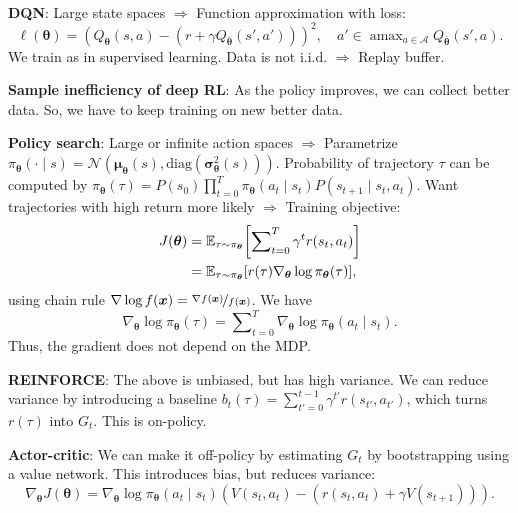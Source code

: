 \documentclass{article}
\DeclareMathOperator*{\argmax}{amax}
\newcommand{\lft}{\mathopen{}\mathclose\bgroup\left}
\newcommand{\rgt}{\aftergroup\egroup\right}
\newcommand{\E}{\mathbb{E}}
\renewcommand{\vec}[1]{\bm{#1}}
\newenvironment{topic}[1]
{\textbf{\sffamily \colorbox{black}{\rlap{\textbf{\textcolor{white}{#1}}}\hspace{\linewidth}\hspace{-2\fboxsep}}} \\ \vspace{0.2cm}}
{}
\begin{document}
\begin{multicols*}{2}
\begin{topic}{Reinforcement learning}
        \textbf{DQN}: Large state spaces $\Rightarrow$ Function approximation with loss: \[
            \ell(\vec{\theta}) = (Q_{\vec{\theta}}(s,a) - (r + \gamma Q_{\bar{\vec{\theta}}}(s', a')))^2, \quad a' \in \argmax\nolimits_{a \in \mathcal{A}} Q_{\bar{\vec{\theta}}}(s', a).
        \]
        We train as in supervised learning. Data is not i.i.d. $\Rightarrow$ Replay buffer.

        \textbf{Sample inefficiency of deep RL}: As the policy improves, we can collect better data.
        So, we have to keep training on new better data.

        \textbf{Policy search}: Large or infinite action spaces $\Rightarrow$ Parametrize $\pi_{\vec{\theta}}(\cdot \mid s) = \mathcal{N}(\vec{\mu}_{\vec{\theta}}(s), \mathrm{diag}(\vec{\sigma}_{\vec{\theta}}^2(s)))$.
        Probability of trajectory $\tau$ can be computed by $\pi_{\vec{\theta}}(\tau) = P(s_0) \prod\nolimits_{t=0}^T \pi_{\vec{\theta}}(a_t \mid s_t) P(s_{t+1} \mid s_t, a_t)$.
        Want trajectories with high return more likely $\Rightarrow$ Training objective:
        \begin{align*}
            J(\vec{\theta}) & = \E_{\tau \sim \pi_{\vec{\theta}}} \lft[ \sum\nolimits_{t=0}^{T} \gamma^t r(s_t, a_t) \rgt]         \\
                            & = \E_{\tau \sim \pi_{\vec{\theta}}} [ r(\tau) \nabla_{\vec{\theta}} \log \pi_{\vec{\theta}}(\tau) ],
        \end{align*}
        using chain rule $\nabla \log f(\vec{x}) = \nicefrac{\nabla f(\vec{x})}{f(\vec{x})}$. We have \[
            \nabla_{\vec{\theta}} \log \pi_{\vec{\theta}}(\tau) = \sum\nolimits_{t=0}^{T} \nabla_{\vec{\theta}} \log \pi_{\vec{\theta}}(a_t \mid s_t).
        \]
        Thus, the gradient does not depend on the MDP.

        \textbf{REINFORCE}: The above is unbiased, but has high variance. We can reduce variance by
        introducing a baseline $b_t(\tau) = \sum_{t'=0}^{t-1} \gamma^{t'} r(s_{t'}, a_{t'})$, which
        turns $r(\tau)$ into $G_t$. This is on-policy.

        \textbf{Actor-critic}: We can make it off-policy by estimating $G_t$ by bootstrapping using a value network. This introduces bias, but reduces variance: \[
            \nabla_{\vec{\theta}} J(\vec{\theta}) = \nabla_{\vec{\theta}} \log \pi_{\vec{\theta}} (a_t \mid s_t) (V(s_t, a_t) - (r(s_t, a_t) + \gamma V(s_{t+1}))).
        \]


\end{topic}
\end{multicols*}
\end{document}
